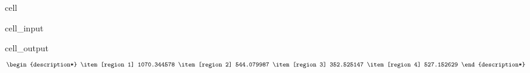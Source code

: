 \documentclass[letterpaper,10pt,english]{jupyterBook}
\begin{document}
\begin{sphinxuseclass}{cell}\begin{sphinxVerbatimInput}

\begin{sphinxuseclass}{cell_input}
\begin{sphinxVerbatim}[commandchars=\\\{\}]
\end{sphinxVerbatim}

\end{sphinxuseclass}\end{sphinxVerbatimInput}
\begin{sphinxVerbatimOutput}

\begin{sphinxuseclass}{cell_output}\begin{equation*}
\begin{split}\begin{description*}
\item[region 1] 1070.344578
\item[region 2] 544.079987
\item[region 3] 352.525147
\item[region 4] 527.152629
\end{description*}\end{split}
\end{equation*}
\end{sphinxuseclass}\end{sphinxVerbatimOutput}

\end{sphinxuseclass}
\end{document}
